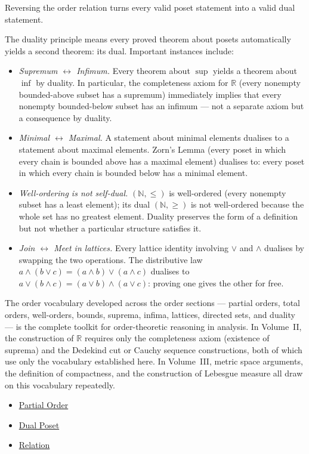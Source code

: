 \begin{remark*}[Interpretation]
Reversing the order relation turns every valid poset statement into a valid
dual statement.
\end{remark*}

\begin{remark*}[Exposition]
The duality principle means every proved theorem about posets automatically
yields a second theorem: its dual. Important instances include:
\begin{itemize}
  \item \emph{Supremum $\leftrightarrow$ Infimum.}  Every theorem about
        $\sup$ yields a theorem about $\inf$ by duality.  In particular,
        the completeness axiom for $\mathbb{R}$ (every nonempty bounded-above
        subset has a supremum) immediately implies that every nonempty
        bounded-below subset has an infimum --- not a separate axiom but a
        consequence by duality.
  \item \emph{Minimal $\leftrightarrow$ Maximal.}  A statement about minimal
        elements dualises to a statement about maximal elements.  Zorn's Lemma
        (every poset in which every chain is bounded above has a maximal
        element) dualises to: every poset in which every chain is bounded below
        has a minimal element.
  \item \emph{Well-ordering is not self-dual.}
        $(\mathbb{N}, \leq)$ is well-ordered (every nonempty subset has a
        least element); its dual $(\mathbb{N}, \geq)$ is not well-ordered
        because the whole set has no greatest element.  Duality preserves
        the form of a definition but not whether a particular structure
        satisfies it.
  \item \emph{Join $\leftrightarrow$ Meet in lattices.}  Every lattice identity
        involving $\vee$ and $\wedge$ dualises by swapping the two operations.
        The distributive law $a \wedge (b \vee c) = (a \wedge b) \vee
        (a \wedge c)$ dualises to $a \vee (b \wedge c) =
        (a \vee b) \wedge (a \vee c)$: proving one gives the other for free.
\end{itemize}
\end{remark*}

\begin{remark*}[Exposition]
The order vocabulary developed across the order sections --- partial orders,
total orders, well-orders, bounds, suprema, infima, lattices, directed sets,
and duality --- is the complete toolkit for order-theoretic reasoning in analysis.
In Volume~II, the construction of $\mathbb{R}$ requires only the completeness
axiom (existence of suprema) and the Dedekind cut or Cauchy sequence
constructions, both of which use only the vocabulary established here.  In
Volume~III, metric space arguments, the definition of compactness, and the
construction of Lebesgue measure all draw on this vocabulary repeatedly.
\end{remark*}

\begin{dependencies}
\begin{itemize}
  \item \hyperref[def:partial-order]{Partial Order}
  \item \hyperref[def:dual-poset]{Dual Poset}
  \item \hyperref[def:relation]{Relation}
\end{itemize}
\end{dependencies}
